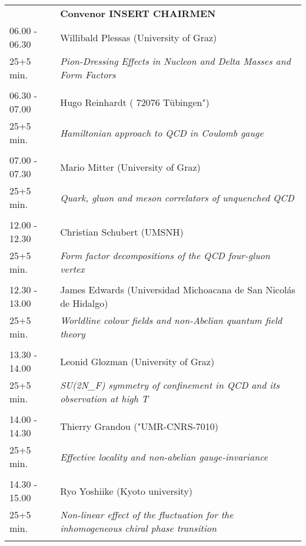 \begin{longtable}{p{3cm}p{13cm}}
&\hfill {\bf Convenor INSERT CHAIRMEN }\\ 
06.00 - 06.30 & Willibald Plessas (University of Graz)\\ 
25+5 min. & {\it Pion-Dressing Effects in Nucleon and Delta Masses and Form Factors}\\ 
 & \\ 
06.30 - 07.00 & Hugo Reinhardt ( 72076 Tübingen")\\ 
25+5 min. & {\it Hamiltonian approach to QCD in Coulomb gauge}\\ 
 & \\ 
07.00 - 07.30 & Mario Mitter (University of Graz)\\ 
25+5 min. & {\it Quark, gluon and meson correlators of unquenched QCD}\\ 
 & \\ 
12.00 - 12.30 & Christian Schubert (UMSNH)\\ 
25+5 min. & {\it Form factor decompositions of the QCD four-gluon vertex}\\ 
 & \\ 
12.30 - 13.00 & James Edwards (Universidad Michoacana de San Nicolás de Hidalgo)\\ 
25+5 min. & {\it Worldline colour fields and non-Abelian quantum field theory}\\ 
 & \\ 
13.30 - 14.00 & Leonid Glozman (University of Graz)\\ 
25+5 min. & {\it SU(2N\_F) symmetry of confinement in QCD and its observation at high T}\\ 
 & \\ 
14.00 - 14.30 & Thierry Grandou ("UMR-CNRS-7010)\\ 
25+5 min. & {\it Effective locality and non-abelian gauge-invariance}\\ 
 & \\ 
14.30 - 15.00 & Ryo Yoshiike (Kyoto university)\\ 
25+5 min. & {\it Non-linear effect of the fluctuation for the inhomogeneous chiral phase transition}\\ 
 & \\ 
\end{longtable}

